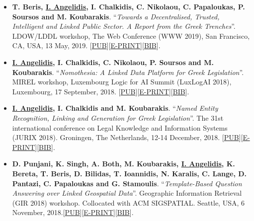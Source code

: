 \documentclass[a4paper,oneside,11pt]{article}
\begin{document}
\begin{itemize}

\item \textbf{T. Beris, \underline{I. Angelidis}, I. Chalkidis, C. Nikolaou, C. Papaloukas, P. Soursos and M. Koubarakis}. ``\textit{Towards a Decentralised, Trusted, Intelligent and Linked Public Sector. A Report from the Greek Trenches}''. LDOW/LDDL workshop, The Web Conference (WWW 2019), San Francisco, CA, USA, 13 May, 2019. [\href{https://dl.acm.org/citation.cfm?doid=3308560.3317077}{PUB}][\href{https://iosang.github.io/documents/Publications/2019/www19companion-206.pdf}{E-PRINT}][\href{https://iosang.github.io/documents/Publications/2019/3317077.bib}{BIB}].

\item \textbf{\underline{I. Angelidis}, I. Chalkidis, C. Nikolaou, P. Soursos and M. Koubarakis}. ``\textit{Nomothesia: A Linked Data Platform for Greek Legislation}''. MIREL workshop, Luxembourg Logic for AI Summit (LuxLogAI 2018), Luxembourg, 17 September, 2018. [\href{https://ora.ox.ac.uk/objects/uuid:b19c1428-49db-402b-8afd-b8cf588e147d}{PUB}][\href{https://iosang.github.io/documents/Publications/2018/nomothesia-linked-data.pdf}{E-PRINT}][\href{https://ora.ox.ac.uk/objects/uuid:b19c1428-49db-402b-8afd-b8cf588e147d/export_record.bibtex}{BIB}].

\item \textbf{\underline{I. Angelidis}, I. Chalkidis and M. Koubarakis}. ``\textit{Named Entity Recognition, Linking and Generation for Greek Legislation}''. The 31st international conference on Legal Knowledge and Information Systems (JURIX 2018). Groningen, The Netherlands, 12-14 December‚ 2018. [\href{https://doi.org/10.3233/978-1-61499-935-5-1}{PUB}][\href{https://iosang.github.io/documents/Publications/2018/jurix2018.pdf}{E-PRINT}][\href{https://dblp.uni-trier.de/rec/bib1/conf/jurix/AngelidisCK18.bib}{BIB}].

\item \textbf{D. Punjani, K. Singh, A. Both, M. Koubarakis, \underline{I. Angelidis}, K. Bereta, T. Beris, D. Bilidas, T. Ioannidis, N. Karalis, C. Lange, D. Pantazi, C. Papaloukas and G. Stamoulis}. ``\textit{Template-Based Question Answering over Linked Geospatial Data}''. Geographic Information Retrieval (GIR 2018) workshop. Collocated with ACM SIGSPATIAL. Seattle, USA, 6 November, 2018.[\href{https://doi.org/10.1145/3281354.3281362}{PUB}][\href{https://iosang.github.io/documents/Publications/2018/template-based-GeoQA.pdf}{E-PRINT}][\href{https://dl.acm.org/downformats.cfm?id=3281362&parent_id=3281354&expformat=bibtex}{BIB}].


\end{itemize}
\end{document}
